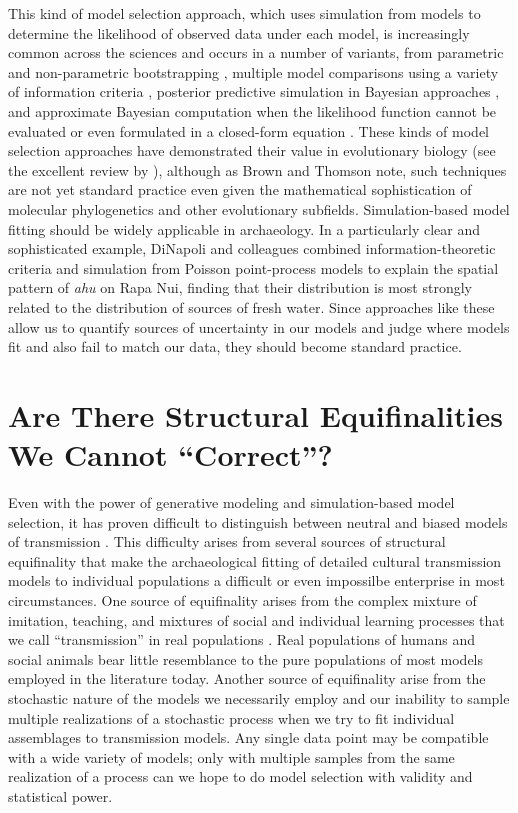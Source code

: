 This kind of model selection approach, which uses simulation from models to determine the likelihood of observed data under each model, is increasingly common across the sciences and occurs in a number of variants, from parametric and non-parametric bootstrapping \citep{efron1981nonparametric,efron1993introduction}, multiple model comparisons using a variety of information criteria \citep{burnham2002model}, posterior predictive simulation in Bayesian approaches \citep{gelman2013bayesian,gelman1996posterior,mcelreath2020statistical,robert1994bayesian}, and approximate Bayesian computation when the likelihood function cannot be evaluated or even formulated in a closed-form equation \citep{Beaumont2002,Toni2009,Beaumont2010,Csillery:2010jd,Marin2012,sisson2018handbook}.  These kinds of model selection approaches have demonstrated their value in evolutionary biology (see the excellent review by \citealp{brown2018modelperformance}), although as Brown and Thomson note, such techniques are not yet standard practice even given the mathematical sophistication of molecular phylogenetics and other evolutionary subfields.  Simulation-based model fitting should be widely applicable in archaeology.  In a particularly clear and sophisticated example, DiNapoli and colleagues \citeyearpar{dinapoli2019rapa} combined information-theoretic criteria and simulation from Poisson point-process models to explain the spatial pattern of \emph{ahu} on Rapa Nui, finding that their distribution is most strongly related to the distribution of sources of fresh water.  Since approaches like these allow us to quantify sources of uncertainty in our models and judge where models fit and also fail to match our data, they should become standard practice.  


\section{Are There Structural Equifinalities We Cannot ``Correct''?}

Even with the power of generative modeling and simulation-based model selection, it has proven difficult to distinguish between neutral and biased models of transmission \citep{kandler2019analysing}. This difficulty arises from several sources of structural equifinality that make the archaeological fitting of detailed cultural transmission models to individual populations a difficult or even impossilbe enterprise in most circumstances.  One source of equifinality arises from the complex mixture of imitation, teaching, and mixtures of social and individual learning processes that we call ``transmission'' in real populations \citep{wimsatt2019articulating}.  Real populations of humans and social animals bear little resemblance to the pure populations of most models employed in the literature today.  Another source of equifinality arise from the stochastic nature of the models we necessarily employ and our inability to sample multiple realizations of a stochastic process when we try to fit individual assemblages to transmission models.  Any single data point may be compatible with a wide variety of models; only with multiple samples from the same realization of a process can we hope to do model selection with validity and statistical power.

